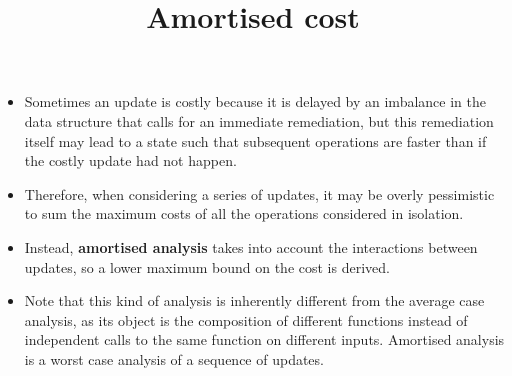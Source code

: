 \documentclass[wide]{slides}
\begin{document}
\begin{slide}
  \title{Amortised cost}

  \begin{itemize}

    \item Sometimes an update is costly because it is delayed by an
      imbalance in the data structure that calls for an immediate
      remediation, but this remediation itself may lead to a state
      such that subsequent operations are faster than if the costly
      update had not happen.

    \item Therefore, when considering a series of updates, it may be
      overly pessimistic to sum the maximum costs of all the
      operations considered in isolation.

    \item Instead, \textbf{amortised analysis} takes into account the
      interactions between updates, so a lower maximum bound on the
      cost is derived.

    \item Note that this kind of analysis is inherently different from
      the average case analysis, as its object is the composition of
      different functions instead of independent calls to the same
      function on different inputs. Amortised analysis is a
      worst case analysis of a sequence of updates.

  \end{itemize}

\end{slide}
\end{document}
